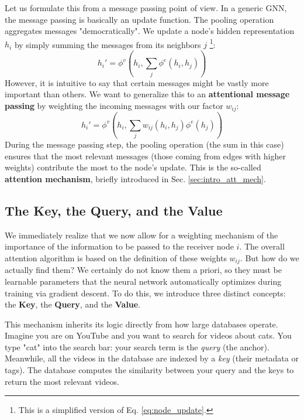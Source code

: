 Let us formulate this from a message passing point of view. In a generic GNN, the message passing is basically an update function. The pooling operation aggregates messages "democratically". We update a node's hidden representation $h_i$ by simply summing the messages from its neighbors $j$ \footnote{This is a simplified version of Eq. \ref{eq:node_update}.}:
\begin{equation}
    h_i' = \phi^v\left(h_i, \sum_j \phi^e(h_i, h_j)\right)
\end{equation}
However, it is intuitive to say that certain messages might be vastly more important than others. We want to generalize this to an \textbf{attentional message passing} by weighting the incoming messages with our factor $w_{ij}$:
\begin{equation}
    h_i' = \phi^v\left(h_i, \sum_j w_{ij}(h_i, h_j) \phi^e(h_j)\right)
\end{equation}
During the message passing step, the pooling operation (the sum in this case) ensures that the most relevant messages (those coming from edges with higher weights) contribute the most to the node's update. This is the so-called \textbf{attention mechanism}, briefly introduced in Sec. \ref{sec:intro_att_mech}.

\subsection{The Key, the Query, and the Value}

We immediately realize that we now allow for a weighting mechanism of the importance of the information to be passed to the receiver node $i$. The overall attention algorithm is based on the definition of these weights $w_{ij}$. But how do we actually find them? We certainly do not know them a priori, so they must be learnable parameters that the neural network automatically optimizes during training via gradient descent. To do this, we introduce three distinct concepts: the \textbf{Key}, the \textbf{Query}, and the \textbf{Value}.

This mechanism inherits its logic directly from how large databases operate. Imagine you are on YouTube and you want to search for videos about cats. You type "cat" into the search bar: your search term is the \textit{query} (the anchor). Meanwhile, all the videos in the database are indexed by a \textit{key} (their metadata or tags). The database computes the similarity between your query and the keys to return the most relevant videos.

